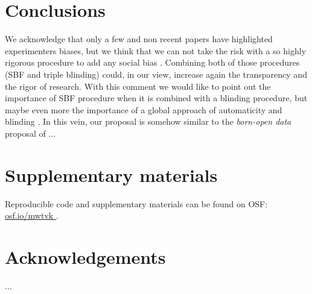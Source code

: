 \documentclass[a4paper,man,natbib,floatsintext,donotrepeattitle]{apa6}
\begin{document}

\section{Conclusions}

We acknowledge that only a few and non recent papers have highlighted experimenters biases, but we think that we can not take the risk with a so highly rigorous procedure to add any social bias . Combining both of those procedures (SBF and triple blinding) could, in our view, increase again the transparency and the rigor of research. With this comment we would like to point out the importance of SBF procedure when it is combined with a blinding procedure, but maybe even more the importance of a global approach of automaticity and blinding . In this vein, our proposal is somehow similar to the \textit{born-open data} proposal of \cite{rouder_what_2016}... 

\section{Supplementary materials}\label{sec:supp}

Reproducible code and supplementary materials can be found on OSF: \url{osf.io/mwtvk
}.

\section{Acknowledgements}

...


\end{document}
